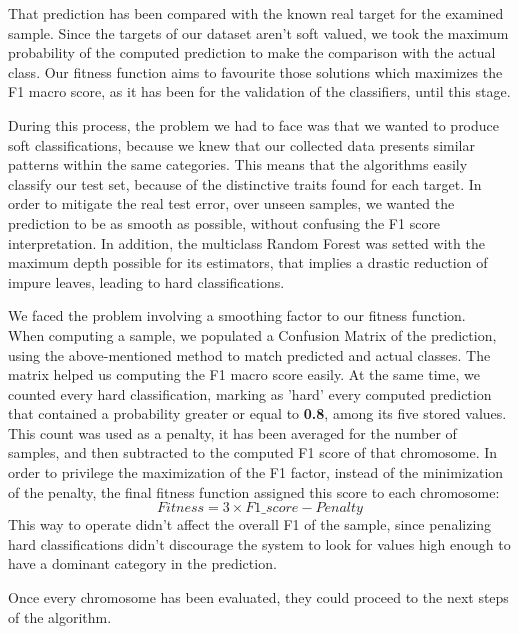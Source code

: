 \begin{itemize}
	That prediction has been compared with the known real target for the examined sample.
	Since the targets of our dataset aren't soft valued, we took the maximum probability of the computed prediction to make the comparison with the actual class.
	Our fitness function aims to favourite those solutions which maximizes the F1 macro score, as it has been for the validation of the classifiers, until this stage.
	
	During this process, the problem we had to face was that we wanted to produce soft classifications, because we knew that our collected data presents similar patterns within the same categories. This means that the algorithms easily classify our test set, because of the distinctive traits found for each target. In order to mitigate the real test error, over unseen samples, we wanted the prediction to be as smooth as possible, without confusing the F1 score interpretation. In addition, the multiclass Random Forest was setted with the maximum depth possible for its estimators, that implies a drastic reduction of impure leaves, leading to hard classifications.
	
	We faced the problem involving a smoothing factor to our fitness function.\\
	When computing a sample, we populated a Confusion Matrix of the prediction, using the above-mentioned method to match predicted and actual classes. The matrix helped us computing the F1 macro score easily. At the same time, we counted every hard classification, marking as 'hard' every computed prediction that contained a probability greater or equal to \textbf{0.8}, among its five stored values.
	This count was used as a penalty, it has been averaged for the number of samples, and then subtracted to the computed F1 score of that chromosome. In order to privilege the maximization of the F1 factor, instead of the minimization of the penalty, the final fitness function assigned this score to each chromosome:
	\[ Fitness = 3 \times F1\_score - Penalty \]
	This way to operate didn't affect the overall F1 of the sample, since penalizing hard classifications didn't discourage the system to look for values high enough to have a dominant category in the prediction.
	
	Once every chromosome has been evaluated, they could proceed to the next steps of the algorithm.
	

\end{itemize}
